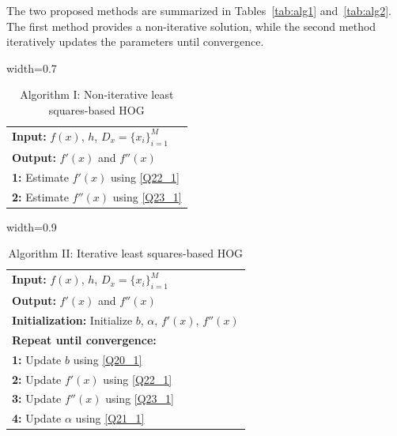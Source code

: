 \documentclass{elsarticle}
\begin{document}
The two proposed methods are summarized in Tables~\ref{tab:alg1} and~\ref{tab:alg2}. 
The first method provides a non-iterative solution, while the second method iteratively updates the parameters until convergence.

\begin{table}[t]
	\centering
	\normalsize
	\caption{Algorithm I: Non-iterative least squares-based HOG}
	\label{my-labelI}
 \begin{adjustbox}{width=0.7\linewidth}
		\begin{tabular}{l}
			\hline
			\textbf{Input:} $f(x)$, $h$, $D_x=\{x_i\}_{i=1}^{M}$ \\
			\textbf{Output:} $f'(x)$ and $f''(x)$ \\
			\hline
			\textbf{1:} Estimate $f'(x)$ using \eqref{Q22_1} \\
			\textbf{2:} Estimate $f''(x)$ using \eqref{Q23_1} \\
			\hline
		\end{tabular}
	\end{adjustbox}
\end{table}


\begin{table}[t]
	\centering
	\normalsize
	\caption{Algorithm II: Iterative least squares-based HOG}
	\label{my-labelII}
	\begin{adjustbox}{width=0.9\linewidth}
		\begin{tabular}{l}
			\hline
			\textbf{Input:} $f(x)$, $h$, $D_x=\{x_i\}_{i=1}^{M}$ \\
			\textbf{Output:} $f'(x)$ and $f''(x)$ \\
			\textbf{Initialization:} Initialize $b$, $\alpha$, $f'(x)$, $f''(x)$ \\
			\hline
			\textbf{Repeat until convergence:} \\
			\textbf{1:} Update $b$ using \eqref{Q20_1} \\
			\textbf{2:} Update $f'(x)$ using \eqref{Q22_1} \\
			\textbf{3:} Update $f''(x)$ using \eqref{Q23_1} \\
			\textbf{4:} Update $\alpha$ using \eqref{Q21_1} \\
			\hline
		\end{tabular}
	\end{adjustbox}
\end{table}

\end{document}
